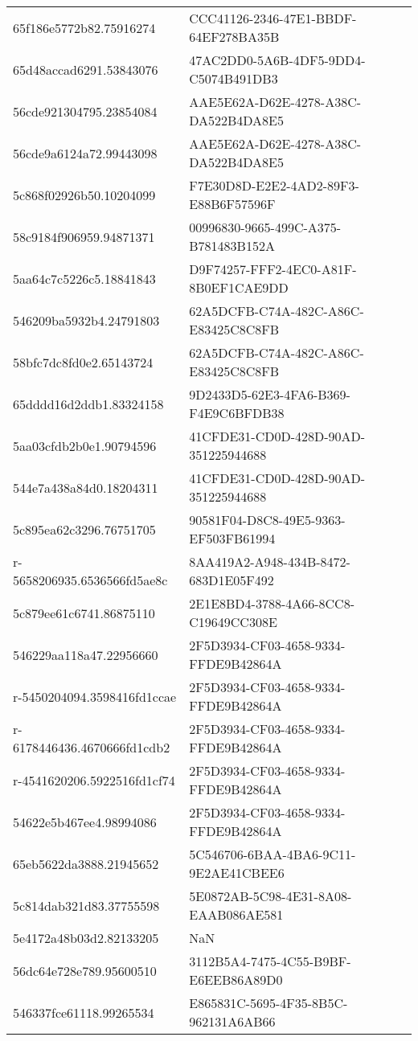 \begin{tabular}{ll}
65f186e5772b82.75916274 & CCC41126-2346-47E1-BBDF-64EF278BA35B \\
65d48accad6291.53843076 & 47AC2DD0-5A6B-4DF5-9DD4-C5074B491DB3 \\
56cde921304795.23854084 & AAE5E62A-D62E-4278-A38C-DA522B4DA8E5 \\
56cde9a6124a72.99443098 & AAE5E62A-D62E-4278-A38C-DA522B4DA8E5 \\
5c868f02926b50.10204099 & F7E30D8D-E2E2-4AD2-89F3-E88B6F57596F \\
58c9184f906959.94871371 & 00996830-9665-499C-A375-B781483B152A \\
5aa64c7c5226c5.18841843 & D9F74257-FFF2-4EC0-A81F-8B0EF1CAE9DD \\
546209ba5932b4.24791803 & 62A5DCFB-C74A-482C-A86C-E83425C8C8FB \\
58bfc7dc8fd0e2.65143724 & 62A5DCFB-C74A-482C-A86C-E83425C8C8FB \\
65dddd16d2ddb1.83324158 & 9D2433D5-62E3-4FA6-B369-F4E9C6BFDB38 \\
5aa03cfdb2b0e1.90794596 & 41CFDE31-CD0D-428D-90AD-351225944688 \\
544e7a438a84d0.18204311 & 41CFDE31-CD0D-428D-90AD-351225944688 \\
5c895ea62c3296.76751705 & 90581F04-D8C8-49E5-9363-EF503FB61994 \\
r-5658206935.6536566fd5ae8c & 8AA419A2-A948-434B-8472-683D1E05F492 \\
5c879ee61c6741.86875110 & 2E1E8BD4-3788-4A66-8CC8-C19649CC308E \\
546229aa118a47.22956660 & 2F5D3934-CF03-4658-9334-FFDE9B42864A \\
r-5450204094.3598416fd1ccae & 2F5D3934-CF03-4658-9334-FFDE9B42864A \\
r-6178446436.4670666fd1cdb2 & 2F5D3934-CF03-4658-9334-FFDE9B42864A \\
r-4541620206.5922516fd1cf74 & 2F5D3934-CF03-4658-9334-FFDE9B42864A \\
54622e5b467ee4.98994086 & 2F5D3934-CF03-4658-9334-FFDE9B42864A \\
65eb5622da3888.21945652 & 5C546706-6BAA-4BA6-9C11-9E2AE41CBEE6 \\
5c814dab321d83.37755598 & 5E0872AB-5C98-4E31-8A08-EAAB086AE581 \\
5e4172a48b03d2.82133205 & NaN \\
56dc64e728e789.95600510 & 3112B5A4-7475-4C55-B9BF-E6EEB86A89D0 \\
546337fce61118.99265534 & E865831C-5695-4F35-8B5C-962131A6AB66 \\

\end{tabular}
